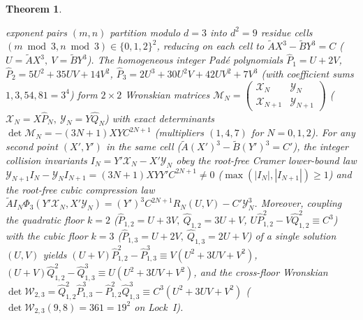 \documentclass[11pt,a4paper]{article}
\theoremstyle{plain}
\newtheorem{theorem}{Theorem}[section]
\theoremstyle{definition}
\begin{document}
\begin{theorem}
\begin{enumerate}[label=\textbf{(\roman*)},leftmargin=*]
  exponent pairs $(m,n)$ partition modulo $d=3$ into $d^2=9$ residue cells $(m\bmod 3,n\bmod 3)\in\{0,1,2\}^2$, reducing on each cell to $\widetilde{A} X^3 - \widetilde{B} Y^3 = C$ ($U = \widetilde{A} X^3,\ V = \widetilde{B} Y^3$). The homogeneous integer Pad\'e polynomials $\widehat{P}_1 = U + 2V$, $\widehat{P}_2 = 5U^2 + 35UV + 14V^2$, $\widehat{P}_3 = 2U^3 + 30U^2V + 42UV^2 + 7V^3$ (with coefficient sums $1, 3, 54, 81 = 3^4$) form $2\times 2$ Wronskian matrices $\mathcal{M}_N = \begin{pmatrix} \mathcal{X}_N & \mathcal{Y}_N \\ \mathcal{X}_{N+1} & \mathcal{Y}_{N+1} \end{pmatrix}$ ($\mathcal{X}_N = X\widehat{P}_N,\ \mathcal{Y}_N = Y\widehat{Q}_N$) with exact determinants $\det\mathcal{M}_N = -(3N+1) X Y C^{2N+1}$ (multipliers $(1, 4, 7)$ for $N = 0, 1, 2$). For any second point $(X',Y')$ in the same cell ($\widetilde{A}(X')^3 - \widetilde{B}(Y')^3 = C'$), the integer collision invariants $I_N = Y'\mathcal{X}_N - X'\mathcal{Y}_N$ obey the root-free Cramer lower-bound law $\mathcal{Y}_{N+1} I_N - \mathcal{Y}_N I_{N+1} = (3N+1) X Y Y' C^{2N+1}\ne 0$ ($\max(|I_N|,|I_{N+1}|)\ge 1$) and the root-free cubic compression law $\widetilde{A} I_N \Phi_3(Y'\mathcal{X}_N, X'\mathcal{Y}_N) = (Y')^3 C^{2N+1} R_N(U,V) - C'\mathcal{Y}_N^3$. Moreover, coupling the quadratic floor $k=2$ ($\widehat{P}_{1,2} = U+3V,\ \widehat{Q}_{1,2} = 3U+V$, $U\widehat{P}_{1,2}^2 - V\widehat{Q}_{1,2}^2 \equiv C^3$) with the cubic floor $k=3$ ($\widehat{P}_{1,3} = U+2V,\ \widehat{Q}_{1,3} = 2U+V$) of a single solution $(U,V)$ yields $(U+V)\widehat{P}_{1,2}^2 - \widehat{P}_{1,3}^3 \equiv V(U^2+3UV+V^2)$, $(U+V)\widehat{Q}_{1,2}^2 - \widehat{Q}_{1,3}^3 \equiv U(U^2+3UV+V^2)$, and the cross-floor Wronskian $\det\mathcal{W}_{2,3} = \widehat{Q}_{1,2}^2\widehat{P}_{1,3}^3 - \widehat{P}_{1,2}^2\widehat{Q}_{1,3}^3 \equiv C^3(U^2+3UV+V^2)$ ($\det\mathcal{W}_{2,3}(9,8) = 361 = 19^2$ on Lock~I).
\end{enumerate}
\end{theorem}
\end{document}
